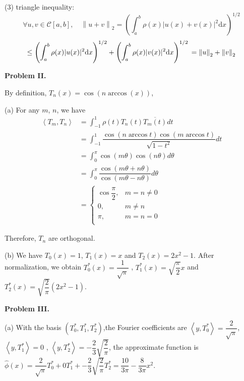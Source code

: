 \documentclass[UTF8]{ctexart}
\newcommand{\dif}{\mathrm{d}}
\newcommand{\avg}[1]{\left\langle #1 \right\rangle}
\newcommand{\norm}[1]{\left\| #1 \right\|}
\begin{document}
(3) triangle inequality:
\[
	\forall u,v \in \mathcal{C}[a,b],\quad \norm{u+v}_2
	= \left( \int_a^b \rho(x) |u(x) + v(x)|^2 \dif x \right)^{1/2}
\]
\[
	\leq \left( \int_a^b \rho(x) |u(x)|^2 \dif x \right)^{1/2}
	+\left( \int_a^b \rho(x) |v(x)|^2 \dif x \right)^{1/2}            \\
	= \norm{u}_2 + \norm{v}_2
\]

\quad

\textbf{Problem II.}

By definition, $T_n(x) = \cos(n \arccos(x))$,

(a) For any $m$, $n$, we have
\[
	\begin{aligned}
		\left\langle  T_m,T_n  \right\rangle
		 & =\int_{-1}^{1} \rho(t)T_n(t)\overline{T_{m}(t)} dt                              \\
		 & =\int_{-1}^{1}\dfrac{\cos(n \arccos t)\cos(m\arccos t)}{\sqrt{1-t^2}} dt        \\
		 & =\int_{0}^{\pi} \cos(m\theta) \cos(n\theta) d\theta                             \\
		 & =\int_{0}^{\pi}\dfrac{\cos(m\theta + n\theta)}{\cos(m\theta - n\theta)} d\theta \\
		 & = \begin{cases}
			\cos \dfrac{\pi}{2}, & m = n \neq 0 \\
			0,                   & m\neq n      \\
			\pi,                 & m = n =0     \\
		\end{cases}
	\end{aligned}
\]

Therefore, ${T_n}$ are orthogonal.

(b) We have $T_0(x)=1 $, $ T_1(x)=x $ and $T_2(x) = 2x^2-1$. After normalization, we obtain $T_0^*(x) = \dfrac{1}{\sqrt{\pi}}$ , $T_1^*(x) = \sqrt{\dfrac{\pi}{2}}x$ and $T_2^*(x)=\sqrt{\dfrac{2}{\pi}}(2x^2-1)$.

\quad

\textbf{Problem III.}

(a) With the basis $(T_0^*,T_1^*,T_2^*)$,the Fourier coefficients are $\avg{y,T_0^*} = \dfrac{2}{\sqrt{\pi}}$, $\avg{y,T_1^*} = 0$ , $\avg{y,T_2^*} = -\dfrac{2}{3}\sqrt{\dfrac{2}{\pi}}$, the approximate function is $\hat{\phi}(x) = \dfrac{2}{\sqrt{\pi}}T_0^* + 0T_1^* + -\dfrac{2}{3}\sqrt{\dfrac{2}{\pi}}T_2^* = \dfrac{10}{3\pi} -\dfrac{8}{3\pi}x^2$.
\end{document}
